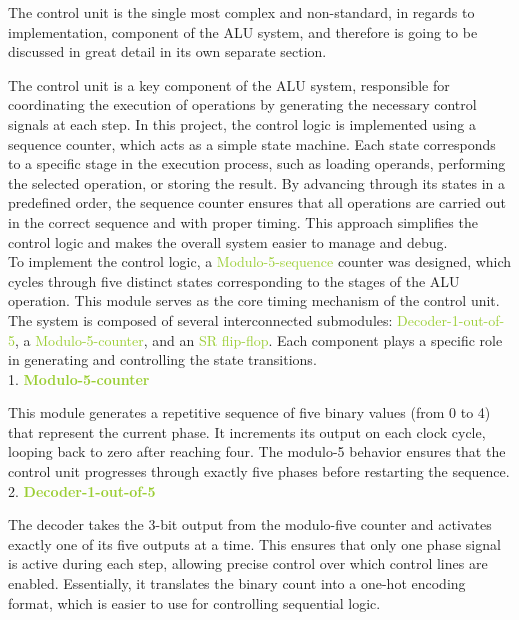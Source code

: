 \documentclass[12pt, letterpaper]{article}
\begin{document}
The control unit is the single most complex and non-standard, in regards to implementation, component of the ALU system, and therefore is going to be
discussed in great detail in its own separate section.


The control unit is a key component of the ALU system, responsible for coordinating the execution of operations by generating the necessary control signals at each step. In this project, the control logic is implemented using a
sequence counter, which acts as a simple state machine. Each state corresponds to a specific stage in the execution process, such as loading operands, performing the selected operation, or storing the result. By advancing through
its states in a predefined order, the sequence counter ensures that all operations are carried out in the correct sequence and with proper timing. This approach simplifies the control logic and makes the overall system easier to
manage and debug.\\

To implement the control logic, a \textcolor{YellowGreen}{Modulo-5-sequence} counter was designed, which cycles through five distinct states corresponding to the stages of the ALU operation.
This module serves as the core timing mechanism of the control
unit. The system is composed of several interconnected submodules:
\textcolor{YellowGreen}{Decoder-1-out-of-5}, a \textcolor{YellowGreen}{Modulo-5-counter}, and an \textcolor{YellowGreen}{SR flip-flop}. Each component plays a specific role in generating and controlling the state transitions.\\

1. \textcolor{YellowGreen}{\textbf{Modulo-5-counter}}

This module generates a repetitive sequence of five binary values (from 0 to 4) that represent the current phase. It increments its output on each clock cycle, looping back to zero after reaching four. The modulo-5 behavior
ensures that the control unit progresses through exactly five phases before restarting the sequence.\\

2. \textcolor{YellowGreen}{\textbf{Decoder-1-out-of-5}}

The decoder takes the 3-bit output from the modulo-five counter and activates exactly one of its five outputs at a time. This ensures that only one phase signal is active during each step, allowing precise control over which
control lines are enabled. Essentially, it translates the binary count into a one-hot encoding format, which is easier to use for controlling sequential logic.\\
\end{document}
